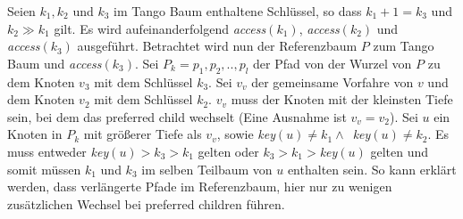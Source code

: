 \documentclass[a4paper,12pt]{article}
\begin{document}
Seien $k_1, k_2$ und $k_3$ im Tango Baum enthaltene Schlüssel, so dass $k_1 + 1 = k_3$ und $k_2 \gg k_1$ gilt. Es wird aufeinanderfolgend \textit{access}$\left(k_1\right)$, \textit{access}$\left(k_2\right)$ und \\ \textit{access}$\left(k_3\right)$ ausgeführt. Betrachtet wird nun der Referenzbaum $P$ zum Tango Baum und \textit{access}$\left(k_3\right)$. Sei $P_k = p_1, p_2,.., p_l$ der Pfad von der Wurzel von $P$ zu dem Knoten $v_3$ mit dem Schlüssel $k_3$. Sei $v_v$ der gemeinsame Vorfahre von $v$ und dem Knoten $v_2$ mit dem Schlüssel $k_2$. $v_v$ muss der Knoten mit der kleinsten Tiefe sein, bei dem das preferred child wechselt (Eine Ausnahme ist $v_v = v_2$). Sei $u$ ein Knoten in $P_k$ mit größerer Tiefe als $v_v$, sowie \mbox{\textit{key}$\left(u\right) \neq k_1 \wedge $ \textit{key}$\left(u \right)\neq k_2 $}. Es muss entweder \textit{key}$\left(u\right) > k_3 > k_1$ gelten oder  $ k_3 > k_1 >$\textit{key}$\left(u\right)$ gelten und somit müssen $k_1$ und $k_3$ im selben Teilbaum von $u$ enthalten sein. So kann erklärt werden, dass verlängerte Pfade im Referenzbaum, hier nur zu wenigen zusätzlichen Wechsel bei preferred children führen. \\  
\end{document}
